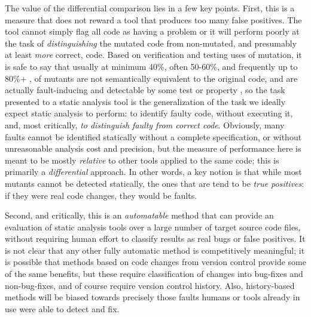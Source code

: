 The value of the differential comparison lies in a few key points.  First, this is a measure that does not reward a tool that produces too many false positives.  The tool cannot simply flag all code as having a problem or it will perform poorly at the task of \emph{distinguishing} the mutated code from non-mutated, and presumably at least \emph{more} correct, code.  Based on verification and testing uses of mutation, it is safe to say that usually at minimum 40\%, often 50-60\%, and frequently up to 80\%+ \cite{mutKernel,groce2018verified,le2014mucheck}, of mutants are not semantically equivalent to the original code, and are actually fault-inducing and detectable by some test or property \cite{TCE,impactEquiv,smith2009should}, so the task presented to a static analysis tool is the generalization of the task we ideally expect static analysis to perform:  to identify faulty code, without executing it, and, most critically, \emph{to distinguish faulty from correct code}.  Obviously, many faults cannot be identified statically without a complete specification, or without unreasonable analysis cost and precision, but the measure of performance here is meant to be mostly \emph{relative} to other tools applied to the same code; this is primarily a \emph{differential} approach.  In other words, a key notion is that while most mutants cannot be detected statically, the ones that are tend to be \emph{true positives}: if they were real code changes, they would be faults.

Second, and critically, this is an \emph{automatable} method that can provide an evaluation of static analysis tools over a large number of target source code files, without requiring human effort to classify results as real bugs or false positives.  It is not clear that any other fully automatic method is competitively meaningful; it is possible that methods based on code changes from version control provide some of the same benefits, but these require classification of changes into bug-fixes and non-bug-fixes, and of course require version control history.  Also, history-based methods will be biased towards precisely those faults humans or tools already in use were able to detect and fix.


